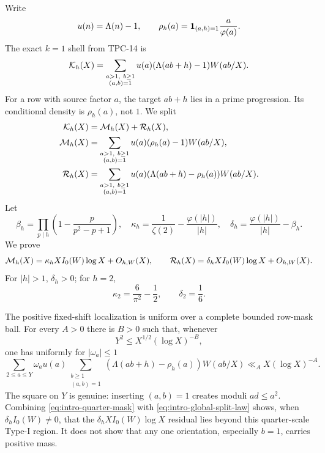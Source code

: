 Write
\begin{equation}
 u(n)=\Lambda(n)-1,
 \qquad
 \rho_h(a)=\mathbf 1_{(a,h)=1}\frac{a}{\varphi(a)}.
 \label{eq:u-rho-definition}
\end{equation}
The exact $k=1$ shell from TPC-14 is
\begin{equation}
 \mathcal K_h(X)=
 \sum_{\substack{a>1,\ b\geq1\\(a,b)=1}}
 u(a)(\Lambda(ab+h)-1)W(ab/X).
 \label{eq:intro-shell}
\end{equation}
For a row with source factor $a$, the target $ab+h$ lies in a prime
progression.  Its conditional density is $\rho_h(a)$, not $1$.  We split
\begin{align}
 \mathcal K_h(X)&=\mathcal M_h(X)+\mathcal R_h(X),
 \label{eq:intro-shell-split}\\
 \mathcal M_h(X)&=
 \sum_{\substack{a>1,\ b\geq1\\(a,b)=1}}
 u(a)(\rho_h(a)-1)W(ab/X),
 \label{eq:intro-local-shell}\\
 \mathcal R_h(X)&=
 \sum_{\substack{a>1,\ b\geq1\\(a,b)=1}}
 u(a)(\Lambda(ab+h)-\rho_h(a))W(ab/X).
 \label{eq:intro-residual-shell}
\end{align}
Let
\begin{equation}
 \beta_h=\prod_{p\mid h}
 \left(1-\frac{p}{p^2-p+1}\right),
 \quad
 \kappa_h=\frac1{\zeta(2)}-\frac{\varphi(|h|)}{|h|},
 \quad
 \delta_h=\frac{\varphi(|h|)}{|h|}-\beta_h.
 \label{eq:beta-kappa-delta}
\end{equation}
We prove
\begin{equation}
 \mathcal M_h(X)=\kappa_hXI_0(W)\log X+O_{h,W}(X),
 \qquad
 \mathcal R_h(X)=\delta_hXI_0(W)\log X+O_{h,W}(X).
 \label{eq:intro-global-split-law}
\end{equation}
For $|h|>1$, $\delta_h>0$; for $h=2$,
\begin{equation}
 \kappa_2=\frac6{\pi^2}-\frac12,
 \qquad \delta_2=\frac16.
 \label{eq:intro-h2-split}
\end{equation}

The positive fixed-shift localization is uniform over a complete bounded
row-mask ball.  For every $A>0$ there is $B>0$ such that, whenever
\begin{equation}
 Y^2\leq X^{1/2}(\log X)^{-B},
 \label{eq:intro-quarter-range}
\end{equation}
one has uniformly for $|\omega_a|\leq1$
\begin{equation}
 \sum_{2\leq a\leq Y}\omega_a u(a)
 \sum_{\substack{b\geq1\\(a,b)=1}}
 (\Lambda(ab+h)-\rho_h(a))W(ab/X)
 \ll_A X(\log X)^{-A}.
 \label{eq:intro-quarter-mask}
\end{equation}
The square on $Y$ is genuine: inserting $(a,b)=1$ creates moduli
$ad\leq a^2$.  Combining \eqref{eq:intro-quarter-mask} with
\eqref{eq:intro-global-split-law} shows, when $\delta_hI_0(W)\ne0$, that
the $\delta_hXI_0(W)\log X$ residual lies beyond this quarter-scale Type-I
region.  It does not show
that any one orientation, especially $b=1$, carries positive mass.

